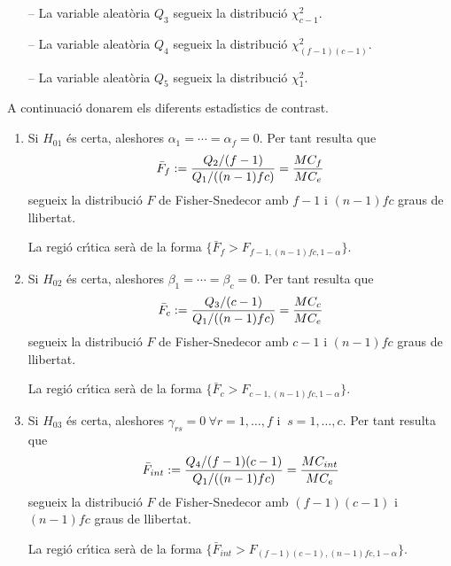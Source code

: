 \begin{enumerate}
\begin{itemize}
\item[--] La variable aleat\`oria $Q_3$ segueix la distribuci\'o $\chi_{c-1}^2$.

\item[--] La variable aleat\`oria $Q_4$ segueix la distribuci\'o $\chi_{(f-1)(c-1)}^2$.

\item[--] La variable aleat\`oria $Q_5$ segueix la distribuci\'o $\chi_1^2$.
\end{itemize}


A continuaci\'o donarem els diferents estad\'{\i}stics de contrast.

\begin{enumerate}
\item Si $H_{01}$ \'es certa, aleshores $\alpha_1 = \cdots = \alpha_f = 0$. Per tant
resulta que
$$\bar{F}_f := {Q_2 / (f-1) \over Q_1 / ((n-1) f c)} = {MC_f \over MC_{e}}$$
segueix la distribuci\'o $F$ de Fisher-Snedecor amb $f-1$ i $(n-1) f c$ graus de
llibertat.

La regi\'o cr\'{\i}tica ser\`a de la forma $\{ \bar{F}_f > F_{f-1,(n-1) f c,1-\alpha} \}$.

\item Si $H_{02}$ \'es certa, aleshores $\beta_1 = \cdots = \beta_c = 0$. Per tant
resulta que
$$\bar{F}_c := {Q_3 / (c-1) \over Q_1 / ((n-1) f c)} = {MC_c \over MC_{e}}$$
segueix la distribuci\'o $F$ de Fisher-Snedecor amb $c-1$ i $(n-1) f c$ graus de
llibertat.

La regi\'o cr\'{\i}tica ser\`a de la forma $\{ \bar{F}_c > F_{c-1,(n-1) f c,1-\alpha} \}$.

\item Si $H_{03}$ \'es certa, aleshores $\gamma_{rs} = 0 \ \forall r = 1, \ldots , f
$ i $ \ s = 1, \ldots ,c$. Per tant resulta que
$$\bar{F}_{int} := {Q_4 / (f-1)(c-1) \over Q_1 / ((n-1) f c)} = {MC_{int} \over
MC_{e}}$$
segueix la distribuci\'o $F$ de Fisher-Snedecor amb $(f-1)(c-1)$ i $(n-1) f c$
graus de llibertat.

La regi\'o cr\'{\i}tica ser\`a de la forma $\{ \bar{F}_{int} > F_{(f-1)(c-1),(n-1) f
c,1-\alpha} \}$.
\end{enumerate}


\end{enumerate}
